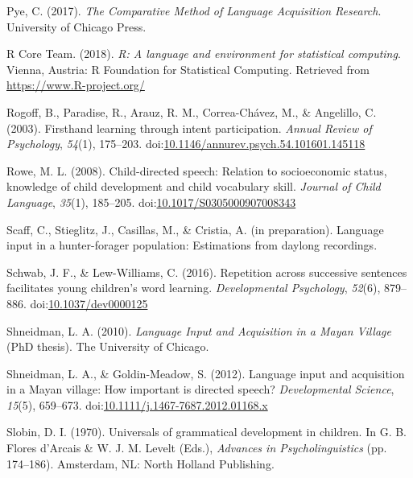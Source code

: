 \documentclass[floatsintext,man]{apa6}
\theoremstyle{definition}
\theoremstyle{definition}
\theoremstyle{definition}
\theoremstyle{remark}
\begin{document}
\hypertarget{ref-pye2017comparative}{}
Pye, C. (2017). \emph{The Comparative Method of Language Acquisition
Research}. University of Chicago Press.

\hypertarget{ref-R-base}{}
R Core Team. (2018). \emph{R: A language and environment for statistical
computing}. Vienna, Austria: R Foundation for Statistical Computing.
Retrieved from \url{https://www.R-project.org/}

\hypertarget{ref-rogoff2003firsthand}{}
Rogoff, B., Paradise, R., Arauz, R. M., Correa-Chávez, M., \& Angelillo,
C. (2003). Firsthand learning through intent participation. \emph{Annual
Review of Psychology}, \emph{54}(1), 175--203.
doi:\href{https://doi.org/10.1146/annurev.psych.54.101601.145118}{10.1146/annurev.psych.54.101601.145118}

\hypertarget{ref-rowe2008child}{}
Rowe, M. L. (2008). Child-directed speech: Relation to socioeconomic
status, knowledge of child development and child vocabulary skill.
\emph{Journal of Child Language}, \emph{35}(1), 185--205.
doi:\href{https://doi.org/10.1017/S0305000907008343}{10.1017/S0305000907008343}

\hypertarget{ref-scaffIPlanguage}{}
Scaff, C., Stieglitz, J., Casillas, M., \& Cristia, A. (in preparation).
Language input in a hunter-forager population: Estimations from daylong
recordings.

\hypertarget{ref-schwab2016repetition}{}
Schwab, J. F., \& Lew-Williams, C. (2016). Repetition across successive
sentences facilitates young children's word learning.
\emph{Developmental Psychology}, \emph{52}(6), 879--886.
doi:\href{https://doi.org/10.1037/dev0000125}{10.1037/dev0000125}

\hypertarget{ref-shneidman2010language}{}
Shneidman, L. A. (2010). \emph{Language Input and Acquisition in a Mayan
Village} (PhD thesis). The University of Chicago.

\hypertarget{ref-shneidman2012language}{}
Shneidman, L. A., \& Goldin-Meadow, S. (2012). Language input and
acquisition in a Mayan village: How important is directed speech?
\emph{Developmental Science}, \emph{15}(5), 659--673.
doi:\href{https://doi.org/10.1111/j.1467-7687.2012.01168.x}{10.1111/j.1467-7687.2012.01168.x}

\hypertarget{ref-slobin1970universals}{}
Slobin, D. I. (1970). Universals of grammatical development in children.
In G. B. Flores d'Arcais \& W. J. M. Levelt (Eds.), \emph{Advances in
Psycholinguistics} (pp. 174--186). Amsterdam, NL: North Holland
Publishing.
\end{document}
